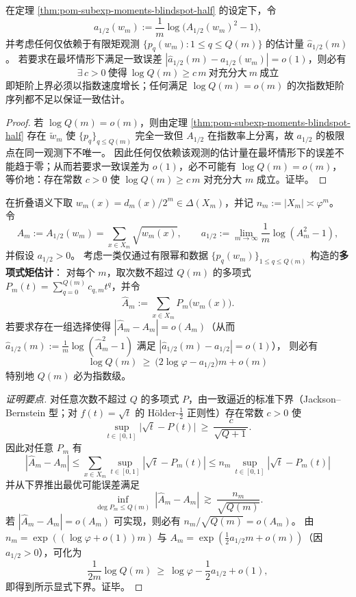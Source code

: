 \begin{proposition}\label{prop:pom-half-exponent-needs-exp-moment-order}
在定理 \ref{thm:pom-subexp-moments-blindspot-half} 的设定下，令
\[
a_{1/2}(w_m):=\frac{1}{m}\log\bigl(A_{1/2}(w_m)^2-1\bigr),
\]
并考虑任何仅依赖于有限矩观测 \(\{p_q(w_m):1\le q\le Q(m)\}\) 的估计量 \(\widehat a_{1/2}(m)\)。
若要求在最坏情形下满足一致误差 \(|\widehat a_{1/2}(m)-a_{1/2}(w_m)|=o(1)\)，则必有
\[
\boxed{\;\exists\,c>0\ \text{使得}\ \log Q(m)\ge c\,m\ \text{对充分大}\ m\ \text{成立}\;}
\]
即矩阶上界必须以指数速度增长；任何满足 \(\log Q(m)=o(m)\) 的次指数矩阶序列都不足以保证一致估计。
\end{proposition}
\begin{proof}
若 \(\log Q(m)=o(m)\)，则由定理 \ref{thm:pom-subexp-moments-blindspot-half} 存在 \(\widetilde w_m\) 使 \(\{p_q\}_{q\le Q(m)}\) 完全一致但 \(A_{1/2}\) 在指数率上分离，故 \(a_{1/2}\) 的极限点在同一观测下不唯一。
因此任何仅依赖该观测的估计量在最坏情形下的误差不能趋于零；从而若要求一致误差为 \(o(1)\)，必不可能有 \(\log Q(m)=o(m)\)，等价地：存在常数 \(c>0\) 使 \(\log Q(m)\ge c\,m\) 对充分大 \(m\) 成立。证毕。
\end{proof}

\begin{proposition}\label{prop:pom-half-exponent-explicit-moment-order-lb}
在折叠语义下取 \(w_m(x)=d_m(x)/2^m\in\Delta(X_m)\)，并记 \(n_m:=|X_m|\asymp \varphi^{m}\)。
令
\[
A_m:=A_{1/2}(w_m)=\sum_{x\in X_m}\sqrt{w_m(x)},
\qquad
a_{1/2}:=\lim_{m\to\infty}\frac{1}{m}\log(A_m^2-1),
\]
并假设 \(a_{1/2}>0\)。
考虑一类仅通过有限幂和数据 \(\{p_q(w_m)\}_{1\le q\le Q(m)}\) 构造的\textbf{多项式矩估计}：
对每个 \(m\)，取次数不超过 \(Q(m)\) 的多项式 \(P_m(t)=\sum_{q=0}^{Q(m)}c_{q,m}t^q\)，并令
\[
\widehat A_m:=\sum_{x\in X_m}P_m\!\bigl(w_m(x)\bigr).
\]
若要求存在一组选择使得 \(|\widehat A_m-A_m|=o(A_m)\)（从而 \(\widehat a_{1/2}(m):=\frac1m\log(\widehat A_m^2-1)\) 满足 \(|\widehat a_{1/2}(m)-a_{1/2}|=o(1)\)），
则必有
\[
\boxed{\;
\log Q(m)\ \ge\ \bigl(2\log\varphi-a_{1/2}\bigr)m+o(m)\;}
\]
特别地 \(Q(m)\) 必为指数级。
\end{proposition}
\begin{proof}[证明要点]
对任意次数不超过 \(Q\) 的多项式 \(P\)，由一致逼近的标准下界（Jackson--Bernstein 型；对 \(f(t)=\sqrt{t}\) 的 Hölder-\(\tfrac12\) 正则性）存在常数 \(c>0\) 使
\[
\sup_{t\in[0,1]}\bigl|\sqrt{t}-P(t)\bigr|\ \ge\ \frac{c}{\sqrt{Q+1}}.
\]
因此对任意 \(P_m\) 有
\[
|\widehat A_m-A_m|
\le
\sum_{x\in X_m}\sup_{t\in[0,1]}|\sqrt t-P_m(t)|
\le
n_m\,\sup_{t\in[0,1]}|\sqrt t-P_m(t)|
\]
并从下界推出最优可能误差满足
\[
\inf_{\deg P_m\le Q(m)}\ |\widehat A_m-A_m|\ \gtrsim\ \frac{n_m}{\sqrt{Q(m)}}.
\]
若 \(|\widehat A_m-A_m|=o(A_m)\) 可实现，则必有 \(n_m/\sqrt{Q(m)}=o(A_m)\)。
由 \(n_m=\exp((\log\varphi+o(1))m)\) 与 \(A_m=\exp(\frac12 a_{1/2}m+o(m))\)（因 \(a_{1/2}>0\)），可化为
\[
\frac{1}{2m}\log Q(m)\ \ge\ \log\varphi-\frac12 a_{1/2}+o(1),
\]
即得到所示显式下界。证毕。
\end{proof}

